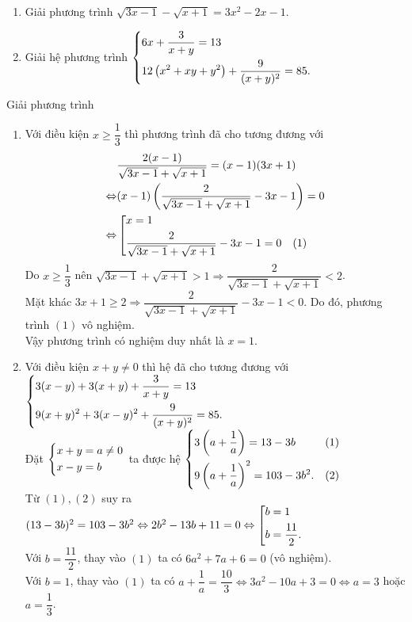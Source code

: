\begin{ex}%
\hfill
\begin{enumerate}
\item Giải phương trình $\sqrt{3x-1}-\sqrt{x+1}=3x^2-2x-1.$
\item Giải hệ phương trình $\left\{\begin{aligned}& 6x+\dfrac{3}{x+y}=13 \\&12\left(x^2+xy+y^2\right)+\dfrac{9}{(x+y)^2}=85.\end{aligned}\right.$
\end{enumerate}
Giải phương trình 
\loigiai
    {
    \begin{enumerate}
        \item Với điều kiện $x \geq \dfrac{1}{3}$ thì phương trình đã cho tương đương với
        {\allowdisplaybreaks
        \begin{align*}
        & \dfrac{2(x-1)}{\sqrt{3x-1}+\sqrt{x+1}}=(x-1)(3x+1) \\
        \Leftrightarrow & (x-1)\left(\dfrac{2}{\sqrt{3x-1}+\sqrt{x+1}}-3x-1\right) =0 \\
        \Leftrightarrow & \left[\begin{aligned}& x=1 \\ & \dfrac{2}{\sqrt{3x-1}+\sqrt{x+1}}-3x-1=0 & (1)\end{aligned}\right.
        \end{align*}}
        Do $x\ge \dfrac{1}{3}$ nên $\sqrt{3x-1}+\sqrt{x+1} >1 \Rightarrow \dfrac{2}{\sqrt{3x-1}+\sqrt{x+1}} < 2$. \\
        Mặt khác $3x+1 \ge 2 \Rightarrow \dfrac{2}{\sqrt{3x-1}+\sqrt{x+1}}-3x-1<0$. Do đó, phương trình $(1)$ vô nghiệm.\\
        Vậy phương trình có nghiệm duy nhất là $x=1$.
        \item Với điều kiện $x+y\ne 0$ thì hệ đã cho tương đương với $\left\{\begin{aligned}& 3(x-y)+3(x+y)+\dfrac{3}{x+y}=13 \\ & 9(x+y)^2+3(x-y)^2+\dfrac{9}{(x+y)^2}=85.\end{aligned}\right.$\\
        Đặt $\left\{\begin{aligned}& x+y=a \neq 0\\ & x-y=b\end{aligned}\right.$ ta được hệ $\left\{\begin{aligned}& 3\left(a+\dfrac{1}{a}\right)=13-3b & (1)\\ & 9\left(a+\dfrac{1}{a}\right)^2=103-3b^2. & (2)\end{aligned}\right.$\\
        Từ $(1), (2)$ suy ra  $(13-3b)^2 = 103-3b^2 \Leftrightarrow 2b^2-13b+11=0 \Leftrightarrow \left[\begin{aligned}& b=1 \\ & b=\dfrac{11}{2}.\end{aligned}\right.$\\
        Với $b=\dfrac{11}{2}$, thay vào $(1)$ ta có $6a^2+7a+6=0$ (vô nghiệm).\\
        Với $b=1$, thay vào $(1)$ ta có $a+\dfrac{1}{a}=\dfrac{10}{3} \Leftrightarrow 3a^2-10a+3=0 \Leftrightarrow a=3$ hoặc $a=\dfrac{1}{3}$.\\

\end{enumerate}}
\end{ex}

